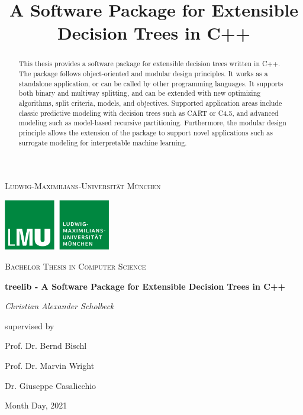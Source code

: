 \documentclass[a4paper, 11pt]{article}
\begin{document}
\title{A Software Package for Extensible Decision Trees in C++}

\begin{titlepage}
	\centering
	\vspace{1cm}
	{\scshape\LARGE Ludwig-Maximilians-Universität München \par}
	\vspace{1.5cm}
	\includegraphics[width=0.35\textwidth]{figure/lmu_logo.png}\par\vspace{1cm}
	\vspace{0.5cm}
	{\scshape\Large Bachelor Thesis in Computer Science\par}
	\vspace{1.5cm}
	{\huge\bfseries treelib - A Software Package for Extensible Decision Trees in C++\par}
	\vspace{2cm}
	{\Large\itshape Christian Alexander Scholbeck\par}
	\vfill
	supervised by\par
	Prof. Dr. Bernd Bischl \par
	Prof. Dr. Marvin Wright \par
	Dr. Giuseppe Casalicchio

	\vfill

	{\large Month Day, 2021 \par}
\end{titlepage}

\newpage
\thispagestyle{empty}

\vspace*{4cm}
\begin{abstract}
This thesis provides a software package for extensible decision trees written in C++. The package follows object-oriented and modular design principles. It works as a standalone application, or can be called by other programming languages. It supports both binary and multiway splitting, and can be extended with new optimizing algorithms, split criteria, models, and objectives. Supported application areas include classic predictive modeling with decision trees such as CART or C4.5, and advanced modeling such as model-based recursive partitioning. Furthermore, the modular design principle allows the extension of the package to support novel applications such as surrogate modeling for interpretable machine learning.

\end{abstract}
\vspace{2cm}
\tableofcontents
\clearpage
\setcounter{page}{1}
\end{document}

